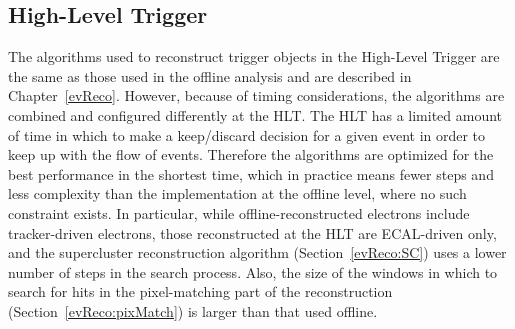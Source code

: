 \subsection{High-Level Trigger}
\label{evSel:HLT}


The algorithms used to reconstruct trigger objects 
in the High-Level Trigger are the same as those 
used in the offline analysis and are described in Chapter~\ref{evReco}.  
However, because of timing considerations, 
the algorithms are combined and configured differently at the HLT.  
The HLT has a limited amount of time in which to 
make a keep/discard decision for a given event 
in order to keep up with the flow of events.  
Therefore the algorithms are optimized for the best 
performance in the shortest time, 
which in practice means fewer steps and less 
complexity than the implementation at the offline level, 
where no such constraint exists.  
In particular, while offline-reconstructed electrons 
include tracker-driven electrons, 
those reconstructed at the HLT are ECAL-driven only, 
and the supercluster reconstruction algorithm 
(Section~\ref{evReco:SC}) uses 
a lower number of steps in the search process.  
Also, the size of the windows in which to search for 
hits in the pixel-matching part of the 
reconstruction (Section~\ref{evReco:pixMatch}) 
is larger than that used offline.  





